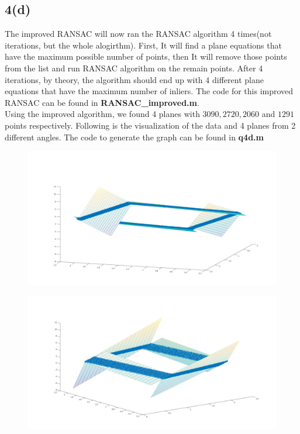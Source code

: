\documentclass{article}
\begin{document}
\subsection*{4(d)}
The improved RANSAC will now ran the RANSAC algorithm 4 times(not iterations, but the whole alogirthm). First, It will find a plane equations that have the maximum possible number of points, then It will remove those points from the list and run RANSAC algorithm on the remain points. After 4 iterations, by theory, the algorithm should end up with 4 different plane equations that have the maximum number of inliers. The code for this improved RANSAC can be found in \textbf{RANSAC\_improved.m}.\\
Using the improved algorithm, we found 4 planes with $3090,2720,2060$ and $1291$ points respectively. Following is the visualization of the data and 4 planes from 2 different angles. The code to generate the graph can be found in \textbf{q4d.m}
\begin{figure}[H]
\centering
\includegraphics[width=5in]{figures/q4d.jpg}
\end{figure}
\begin{figure}[H]
\centering
\includegraphics[width=5in]{figures/q4d-alt.jpg}
\end{figure}
\end{document}
